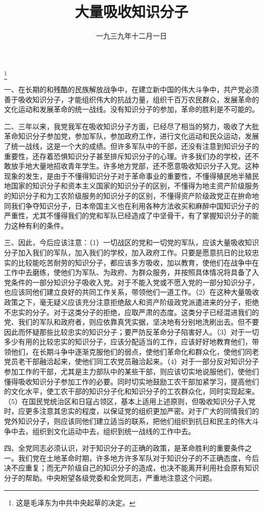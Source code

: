 
\title{大量吸收知识分子}
\date{一九三九年十二月一日}
\thanks{这是毛泽东为中共中央起草的决定。}
\maketitle


一、在长期的和残酷的民族解放战争中，在建立新中国的伟大斗争中，共产党必须善于吸收知识分子，才能组织伟大的抗战力量，组织千百万农民群众，发展革命的文化运动和发展革命的统一战线。没有知识分子的参加，革命的胜利是不可能的。

二、三年以来，我党我军在吸收知识分子方面，已经尽了相当的努力，吸收了大批革命知识分子参加党，参加军队，参加政府工作，进行文化运动和民众运动，发展了统一战线，这是一个大的成绩。但许多军队中的干部，还没有注意到知识分子的重要性，还存着恐惧知识分子甚至排斥知识分子的心理。许多我们办的学校，还不敢放手地大量地招收青年学生。许多地方党部，还不愿意吸收知识分子入党。这种现象的发生，是由于不懂得知识分子对于革命事业的重要性，不懂得殖民地半殖民地国家的知识分子和资本主义国家的知识分子的区别，不懂得为地主资产阶级服务的知识分子和为工农阶级服务的知识分子的区别，不懂得资产阶级政党正在拚命地同我们争夺知识分子，日本帝国主义也在利用各种方法收买和麻醉中国知识分子的严重性，尤其不懂得我们的党和军队已经造成了中坚骨干，有了掌握知识分子的能力这种有利的条件。

三、因此，今后应该注意：（1）一切战区的党和一切党的军队，应该大量吸收知识分子加入我们的军队，加入我们的学校，加入政府工作。只要是愿意抗日的比较忠实的比较能吃苦耐劳的知识分子，都应该多方吸收，加以教育，使他们在战争中在工作中去磨练，使他们为军队、为政府、为群众服务，并按照具体情况将具备了入党条件的一部分知识分子吸收入党。对于不能入党或不愿入党的一部分知识分子，也应该同他们建立良好的共同工作关系，带领他们一道工作。（2）在这种大量吸收政策之下，毫无疑义应该充分注意拒绝敌人和资产阶级政党派遣进来的分子，拒绝不忠实的分子。对于这类分子的拒绝，应取严肃的态度。这类分子已经混进我们的党、我们的军队和政府者，则应依靠真凭实据，坚决地有分别地洗刷出去。但不要因此而怀疑那些比较忠实的知识分子；要严防反革命分子陷害好人。（3）对于一切多少有用的比较忠实的知识分子，应该分配适当的工作，应该好好地教育他们，带领他们，在长期斗争中逐渐克服他们的弱点，使他们革命化和群众化，使他们同老党员老干部融洽起来，使他们同工农党员融洽起来。（4）对于一部分反对知识分子参加工作的干部，尤其是主力部队中的某些干部，则应该切实地说服他们，使他们懂得吸收知识分子参加工作的必要。同时切实地鼓励工农干部加紧学习，提高他们的文化水平，使工农干部的知识分子化和知识分子的工农群众化，同时实现起来。（5）在国民党统治区和日寇占领区，基本上适用上述原则，但吸收知识分子入党时，应更多注意其忠实的程度，以保证党的组织更加严密。对于广大的同情我们的党外知识分子，则应该同他们建立适当的联系，把他们组织到抗日和民主的伟大斗争中去，组织到文化运动中去，组织到统一战线的工作中去。

四、全党同志必须认识，对于知识分子的正确的政策，是革命胜利的重要条件之一。我们党在土地革命时期，许多地方许多军队对于知识分子的不正确态度，今后决不应重复；而无产阶级自己的知识分子的造成，也决不能离开利用社会原有知识分子的帮助。中央盼望各级党委和全党同志，严重地注意这个问题。
